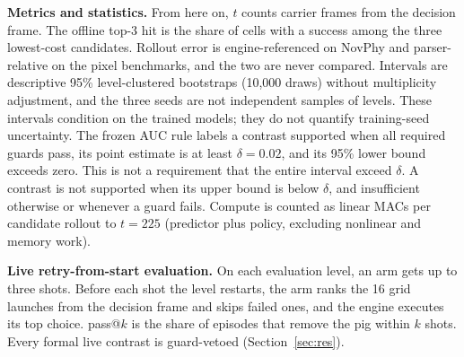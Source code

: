 \begin{revblock}
\textbf{Metrics and statistics.} From here on, $t$ counts carrier frames from the decision frame. The offline top-3 hit is the share of cells with a success among the three lowest-cost candidates. Rollout error is engine-referenced on NovPhy and parser-relative on the pixel benchmarks, and the two are never compared. Intervals are descriptive 95\% level-clustered bootstraps (10,000 draws) without multiplicity adjustment, and the three seeds are not independent samples of levels. These intervals condition on the trained models; they do not quantify training-seed uncertainty. The frozen AUC rule labels a contrast supported when all required guards pass, its point estimate is at least $\delta=0.02$, and its 95\% lower bound exceeds zero. This is not a requirement that the entire interval exceed $\delta$. A contrast is not supported when its upper bound is below $\delta$, and insufficient otherwise or whenever a guard fails. Compute is counted as linear MACs per candidate rollout to $t=225$ (predictor plus policy, excluding nonlinear and memory work).

\textbf{Live retry-from-start evaluation.} On each evaluation level, an arm gets up to three shots. Before each shot the level restarts, the arm ranks the 16 grid launches from the decision frame and skips failed ones, and the engine executes its top choice. pass@$k$ is the share of episodes that remove the pig within $k$ shots. Every formal live contrast is guard-vetoed (Section~\ref{sec:res}).
\end{revblock}
